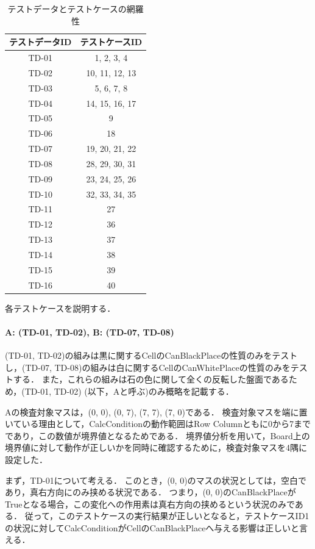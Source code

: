 \documentclass[platex,dvipdfmx,12pt]{jsarticle}
\begin{document}
\begin{table}[H]
  \centering
  \caption{テストデータとテストケースの網羅性}
  \label{tab:enshu5-board-tds}
  \begin{tabular}{cc}
    テストデータID & テストケースID \\
    \hline
    TD-01 & 1, 2, 3, 4 \\
    TD-02 & 10, 11, 12, 13 \\
    TD-03 & 5, 6, 7, 8 \\
    TD-04 & 14, 15, 16, 17 \\
    TD-05 & 9 \\
    TD-06 & 18 \\
    TD-07 & 19, 20, 21, 22 \\
    TD-08 & 28, 29, 30, 31 \\
    TD-09 & 23, 24, 25, 26 \\
    TD-10 & 32, 33, 34, 35 \\
    TD-11 & 27 \\
    TD-12 & 36 \\
    TD-13 & 37 \\
    TD-14 & 38 \\
    TD-15 & 39 \\
    TD-16 & 40 \\
  \end{tabular}
\end{table}

各テストケースを説明する．

\paragraph{A: (TD-01, TD-02), B: (TD-07, TD-08)}

(TD-01, TD-02)の組みは黒に関するCellのCanBlackPlaceの性質のみをテストし，(TD-07, TD-08)の組みは白に関するCellのCanWhitePlaceの性質のみをテストする．
また，これらの組みは石の色に関して全くの反転した盤面であるため，(TD-01, TD-02) (以下，Aと呼ぶ)のみ概略を記載する．

Aの検査対象マスは，(0, 0), (0, 7), (7, 7), (7, 0)である．
検査対象マスを端に置いている理由として，CalcConditionの動作範囲はRow Columnともに0から7までであり，この数値が境界値となるためである．
境界値分析を用いて，Board上の境界値に対して動作が正しいかを同時に確認するために，検査対象マスを4隅に設定した．

まず，TD-01について考える．
このとき，(0, 0)のマスの状況としては，空白であり，真右方向にのみ挟める状況である．
つまり，(0, 0)のCanBlackPlaceがTrueとなる場合，この変化への作用素は真右方向の挟めるという状況のみである．
従って，このテストケースの実行結果が正しいとなると，テストケースID1の状況に対してCalcConditionがCellのCanBlackPlaceへ与える影響は正しいと言える．
\end{document}
